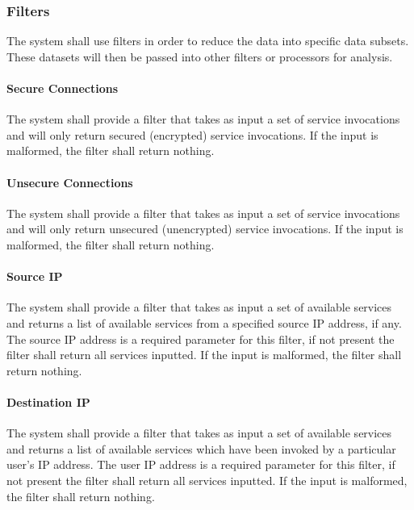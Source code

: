 \documentclass[titlepage]{article}
\begin{document}

\subsubsection{Filters}
The system shall use filters in order to reduce the data into specific data
subsets.  These datasets will then be passed into other filters or
processors for analysis.

\paragraph{Secure Connections}

The system shall provide a filter that takes as input a set of service
invocations and will only return secured (encrypted) service invocations.  If
the input is malformed, the filter shall return nothing.

\paragraph{Unsecure Connections}

The system shall provide a filter that takes as input a set of service
invocations and will only return unsecured (unencrypted) service invocations.
If the input is malformed, the filter shall return nothing.

\paragraph{Source IP}

The system shall provide a filter that takes as input a set of available
services and returns a list of available services from a specified source IP
address, if any.  The source IP address is a required parameter for this
filter, if not present the filter shall return all services inputted.  If the
input is malformed, the filter shall return nothing.

\paragraph{Destination IP}

The system shall provide a filter that takes as input a set of available
services and returns a list of available services which have been invoked by a
particular user's IP address.  The user IP address is a required parameter for
this filter, if not present the filter shall return all services inputted.  If
the input is malformed, the filter shall return nothing.
\end{document}
